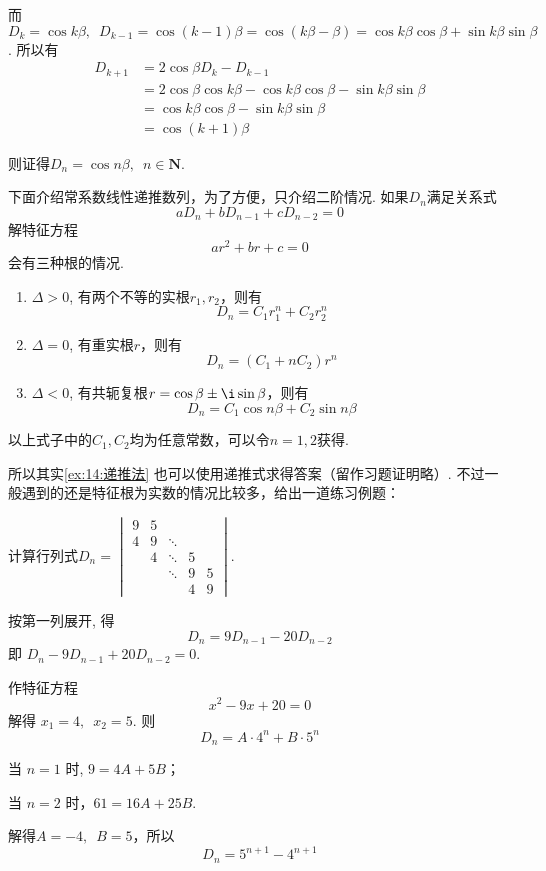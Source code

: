\begin{solution}
    而$D_{k}=\cos k \beta,\enspace
        D_{k-1}=\cos (k-1)\beta = \cos (k \beta-\beta) = \cos k \beta \cos \beta+\sin k \beta \sin \beta$. 所以有
    \begin{align*}
        D_{k+1} & = 2 \cos \beta D_{k}-D_{k-1}                                               \\
                & =2 \cos \beta \cos k \beta-\cos k \beta \cos \beta-\sin k \beta \sin \beta \\
                & =\cos k \beta \cos \beta-\sin k \beta \sin \beta                           \\
                & =\cos (k+1) \beta
    \end{align*}

    则证得$D_n=\cos n\beta,\enspace n\in \mathbf{N}$.
\end{solution}

下面介绍常系数线性递推数列，为了方便，只介绍二阶情况. 如果$D_n$满足关系式
\[ aD_n+bD_{n-1}+cD_{n-2}=0 \]
解特征方程
\[ ar^2+br+c=0 \]
会有三种根的情况.
\begin{enumerate}
    \item $\Delta>0$, 有两个不等的实根$r_1, r_2$，则有
          \[ D_n=C_1r_1^n+C_2r_2^n \]

    \item $\Delta=0$, 有重实根$r$，则有
          \[ D_n=(C_1+nC_2)r^n \]

    \item $\Delta<0$, 有共轭复根$r=\cos\beta\pm \i\sin\beta$，则有
          \[ D_n=C_1\cos n\beta + C_2\sin n\beta \]
\end{enumerate}
以上式子中的$C_1,C_2$均为任意常数，可以令$n=1,2$获得.

所以其实\autoref{ex:14:递推法} 也可以使用递推式求得答案（留作习题证明略）. 不过一般遇到的还是特征根为实数的情况比较多，给出一道练习例题：

\begin{example}
    计算行列式$D_n=
        \begin{vmatrix}
            9 & 5 &        &   &   \\
            4 & 9 & \ddots &   &   \\
              & 4 & \ddots & 5 &   \\
              &   & \ddots & 9 & 5 \\
              &   &        & 4 & 9
        \end{vmatrix}$.
\end{example}

\begin{solution}
    按第一列展开, 得
    \[ D_n=9 D_{n-1}-20 D_{n-2} \]
    即 $ D_n-9 D_{n-1}+20 D_{n-2}=0 $.

    作特征方程
    \[ x^{2}-9 x+20=0 \]
    解得 $ x_1=4,\enspace x_2=5 $. 则
    \[ D_n=A \cdot 4^n+B \cdot 5^n \]

    当 $n=1$ 时, $9=4A+5B$；

    当 $n=2$ 时，$61=16A+25B$.

    解得$A=-4,\enspace B=5$，所以
    \[ D_n=5^{n+1}-4^{n+1} \]
\end{solution}

